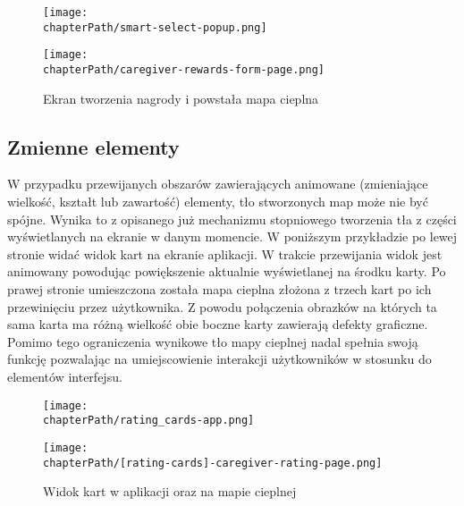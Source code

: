 \bigskip
\begin{figure}[H]
\centering
\begin{minipage}{.3\textwidth}
	\centering
	\texttt{[image: \\chapterPath/smart-select-popup.png]}
\end{minipage}
\begin{minipage}{.3\textwidth}
	\centering
	\texttt{[image: \\chapterPath/caregiver-rewards-form-page.png]}
\end{minipage}
\bigskip
\caption{Ekran tworzenia nagrody i powstała mapa cieplna}
\label{fig:rs_reward_form}
\end{figure}

\subsection{Zmienne elementy}
W przypadku przewijanych obszarów zawierających animowane (zmieniające wielkość, kształt lub zawartość) elementy, tło stworzonych map może nie być spójne. Wynika to z opisanego już mechanizmu stopniowego tworzenia tła z części wyświetlanych na ekranie w danym momencie. W poniższym przykładzie po lewej stronie widać widok kart na ekranie aplikacji. W trakcie przewijania widok jest animowany powodując powiększenie aktualnie wyświetlanej na środku karty. Po prawej stronie umieszczona została mapa cieplna złożona z trzech kart po ich przewinięciu przez użytkownika. Z powodu połączenia obrazków na których ta sama karta ma różną wielkość obie boczne karty zawierają defekty graficzne. Pomimo tego ograniczenia wynikowe tło mapy cieplnej nadal spełnia swoją funkcję pozwalając na umiejscowienie interakcji użytkowników w stosunku do elementów interfejsu.

\bigskip
\begin{figure}[H]
\begin{minipage}{.25\textwidth}
	\centering
	\texttt{[image: \\chapterPath/rating\_cards-app.png]}
\end{minipage}
\begin{minipage}{.74\textwidth}
	\centering
	\texttt{[image: \\chapterPath/[rating-cards]-caregiver-rating-page.png]}
\end{minipage}
\bigskip
\caption{Widok kart w aplikacji oraz na mapie cieplnej}
\label{fig:rs_rating_cards}
\end{figure}
